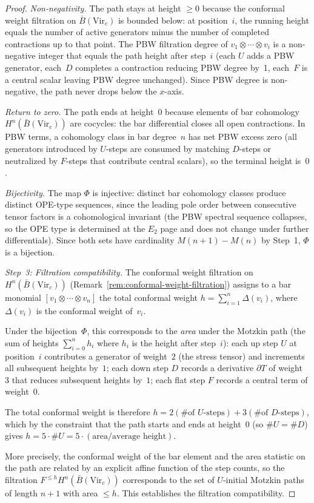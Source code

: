 \begin{proof}
\emph{Non-negativity.}
The path stays at height $\geq 0$ because the conformal
weight filtration on $\bar{B}(\mathrm{Vir}_c)$ is
bounded below: at position~$i$, the running height equals
the number of active generators minus the number of
completed contractions up to that point.
The PBW filtration degree of $v_1 \otimes \cdots \otimes v_i$
is a non-negative integer that equals the path height
after step~$i$ (each $U$ adds a PBW generator, each~$D$
completes a contraction reducing PBW degree by~1,
each~$F$ is a central scalar leaving PBW degree unchanged).
Since PBW degree is non-negative, the path never
drops below the $x$-axis.

\emph{Return to zero.}
The path ends at height~$0$ because elements
of bar cohomology $H^n(\bar{B}(\mathrm{Vir}_c))$
are cocycles: the bar differential closes all open
contractions.  In PBW terms, a cohomology class in
bar degree~$n$ has net PBW excess zero (all generators
introduced by $U$-steps are consumed by matching
$D$-steps or neutralized by $F$-steps that contribute
central scalars), so the terminal height is~$0$.

\emph{Bijectivity.}
The map $\Phi$ is injective: distinct bar cohomology
classes produce distinct OPE-type sequences, since the
leading pole order between consecutive tensor factors
is a cohomological invariant (the PBW spectral sequence
collapses, so the OPE type is determined at the $E_2$
page and does not change under further differentials).
Since both sets have cardinality $M(n{+}1) - M(n)$
by Step~1, $\Phi$ is a bijection.

\medskip
\noindent\emph{Step~3: Filtration compatibility.}
The conformal weight filtration on $H^n(\bar{B}(\mathrm{Vir}_c))$
(Remark~\ref{rem:conformal-weight-filtration})
assigns to a bar monomial $[v_1 \otimes \cdots \otimes v_n]$
the total conformal weight $h = \sum_{i=1}^n \Delta(v_i)$,
where $\Delta(v_i)$ is the conformal weight of~$v_i$.

Under the bijection~$\Phi$, this corresponds to the
\emph{area} under the Motzkin path (the sum of heights
$\sum_{i=0}^{n} h_i$ where $h_i$ is the height after
step~$i$): each up step $U$ at position~$i$ contributes
a generator of weight~$2$ (the stress tensor) and
increments all subsequent heights by~$1$; each down
step $D$ records a derivative $\partial T$ of weight~$3$
that reduces subsequent heights by~$1$; each flat
step $F$ records a central term of weight~$0$.

The total conformal weight is therefore
$h = 2(\text{\# of }U\text{-steps}) + 3(\text{\# of }D\text{-steps})$,
which by the constraint that the path starts and ends
at height~$0$ (so $\#U = \#D$) gives
$h = 5 \cdot \#U = 5 \cdot (\text{area}/\text{average height})$.

More precisely, the conformal weight of the bar element
and the area statistic on the path are related by an
explicit affine function of the step counts, so the
filtration $F^{\leq h} H^n(\bar{B}(\mathrm{Vir}_c))$
corresponds to the set of $U$-initial Motzkin paths
of length $n{+}1$ with area $\leq h$.
This establishes the filtration compatibility.
\end{proof}

